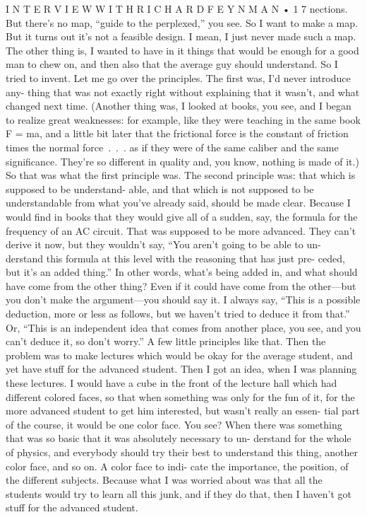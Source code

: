 \documentclass[11pt,oneside]{article}
\begin{document}
I N T E R V I E W  W I T H  R I C H A R D  F E Y N M A N • 1 7 nections. But there’s no map, “guide to the perplexed,” you see. So I want to make a map. But it turns out it’s not a feasible design. I mean, I just never made such a map. The other thing is, I wanted to have in it things that would be enough for a good man to chew on, and then also that the average guy should understand. So I tried to invent. Let me go over the principles. The first was, I’d never introduce any- thing that was not exactly right without explaining that it wasn’t, and what changed next time. (Another thing was, I looked at books, you see, and I began to realize great weaknesses: for example, like they were teaching in the same book F = ma, and a little bit later that the frictional force is the constant of friction times the normal force . . . as if they were of the same caliber and the same significance. They’re so different in quality and, you know, nothing is made of it.) So that was what the first principle was. The second principle was: that which is supposed to be understand- able, and that which is not supposed to be understandable from what you’ve already said, should be made clear. Because I would find in books that they would give all of a sudden, say, the formula for the frequency of an AC circuit. That was supposed to be more advanced. They can’t derive it now, but they wouldn’t say, “You aren’t going to be able to un- derstand this formula at this level with the reasoning that has just pre- ceded, but it’s an added thing.” In other words, what’s being added in, and what should have come from the other thing? Even if it could have come from the other---but you don’t make the argument---you should say it. I always say, “This is a possible deduction, more or less as follows, but we haven’t tried to deduce it from that.” Or, “This is an independent idea that comes from another place, you see, and you can’t deduce it, so don’t worry.” A few little principles like that. Then the problem was to make lectures which would be okay for the average student, and yet have stuff for the advanced student. Then I got an idea, when I was planning these lectures. I would have a cube in the front of the lecture hall which had different colored faces, so that when something was only for the fun of it, for the more advanced student to get him interested, but wasn’t really an essen- tial part of the course, it would be one color face. You see? When there was something that was so basic that it was absolutely necessary to un- derstand for the whole of physics, and everybody should try their best to understand this thing, another color face, and so on. A color face to indi- cate the importance, the position, of the different subjects. Because what I was worried about was that all the students would try to learn all this junk, and if they do that, then I haven’t got stuff for the advanced student.\par
\end{document}
